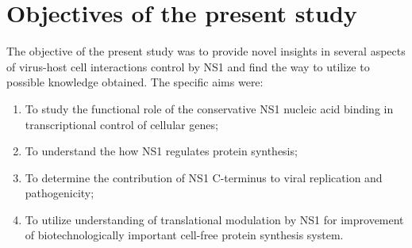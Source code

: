 \newpage
\section{Objectives of the present study}

The objective of the present study was to provide novel insights in several aspects of virus-host cell interactions control by NS1 and find the way to utilize to possible knowledge obtained. The specific aims were:

	\begin{enumerate}
		\item To study the functional role of the conservative NS1 nucleic acid binding in transcriptional control of cellular genes;
		
		\item To understand the how NS1 regulates protein synthesis;
		
		\item To determine the contribution of NS1 C-terminus to viral replication and pathogenicity;
		
		\item To utilize understanding of translational modulation by NS1 for improvement of biotechnologically important cell-free protein synthesis system.
		
	\end{enumerate}